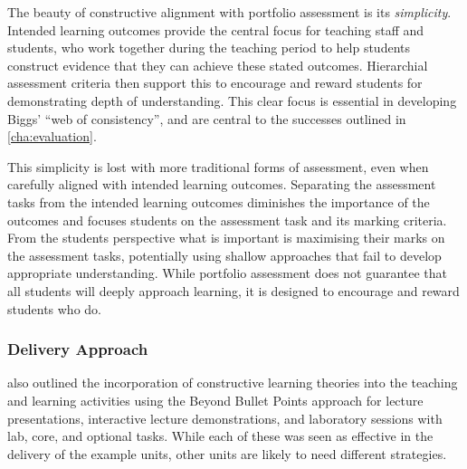 
The beauty of constructive alignment with portfolio assessment is its \emph{simplicity}. Intended learning outcomes provide the central focus for teaching staff and students, who work together during the teaching period to help students construct evidence that they can achieve these stated outcomes. Hierarchial assessment criteria then support this to encourage and reward students for demonstrating depth of understanding. This clear focus is essential in developing Biggs' ``web of consistency'', and are central to the successes outlined in \cref{cha:evaluation}.

This simplicity is lost with more traditional forms of assessment, even when carefully aligned with intended learning outcomes. Separating the assessment tasks from the intended learning outcomes diminishes the importance of the outcomes and focuses students on the assessment task and its marking criteria. From the students perspective what is important is maximising their marks on the assessment tasks, potentially using shallow approaches that fail to develop appropriate understanding. While portfolio assessment does not guarantee that all students will deeply approach learning, it is designed to encourage and reward students who do.


\subsubsection{Delivery Approach} %
\label{ssub:delivery_approach}

 also outlined the incorporation of constructive learning theories into the teaching and learning activities using the Beyond Bullet Points approach for lecture presentations, interactive lecture demonstrations, and laboratory sessions with lab, core, and  optional tasks. While each of these was seen as effective in the delivery of the example units, other units are likely to need different strategies. 

